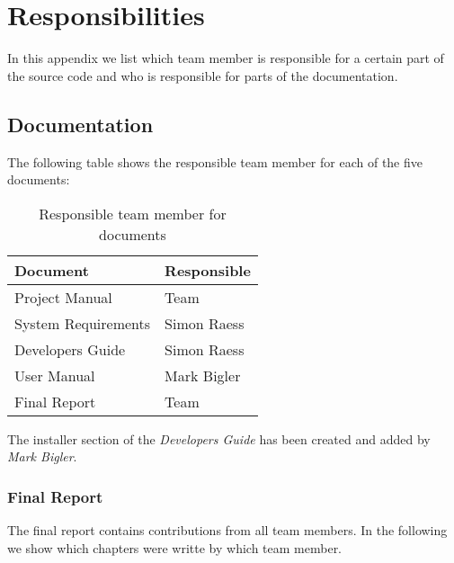 \chapter{Responsibilities}
\label{chapter:responsibilities}

In this appendix we list which team member is responsible for a certain part
of the source code and who is responsible for parts of the documentation.



\section{Documentation}
The following table shows the responsible team member for each of the
five documents:
\begin{table}[H]
 \centering
 \begin{tabular}{|l|l|}
  \hline
   \multicolumn{1}{|p{2.0in}|}{\bfseries{\textsf{Document}}} &
   \multicolumn{1}{|p{1.0in}|}{\bfseries{\textsf{Responsible}}} \\
  \hline
   \multicolumn{1}{|p{2.0in}|}{Project Manual} &
   \multicolumn{1}{|p{1.0in}|}{Team} \\
  \hline
   \multicolumn{1}{|p{2.0in}|}{System Requirements} &
   \multicolumn{1}{|p{1.0in}|}{Simon Raess} \\
  \hline
   \multicolumn{1}{|p{2.0in}|}{Developers Guide} &
   \multicolumn{1}{|p{1.0in}|}{Simon Raess} \\
  \hline
   \multicolumn{1}{|p{2.0in}|}{User Manual} &
   \multicolumn{1}{|p{1.0in}|}{Mark Bigler} \\
  \hline
   \multicolumn{1}{|p{2.0in}|}{Final Report} &
   \multicolumn{1}{|p{1.0in}|}{Team} \\
  \hline
 \end{tabular}
 \caption{Responsible team member for documents}
\end{table}
The installer section of the \emph{Developers Guide} has been created and added by \emph{Mark Bigler}.


\subsection{Final Report}
The final report contains contributions from all team members. In the following
we show which chapters were writte by which team member.

